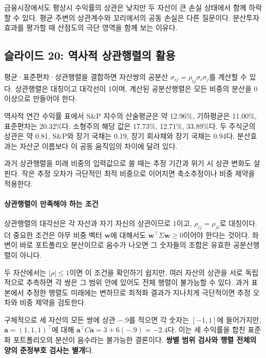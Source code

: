 \documentclass[11pt,a4paper]{article}
\begin{document}
금융시장에서도 평상시 수익률의 상관은 낮지만 두 자산이 큰 손실 상태에서 함께 하락할 수 있다. 평균 주변의 상관계수와 꼬리에서의 공동 손실은 다른 질문이다. 분산투자 효과를 평가할 때 산점도의 극단 영역을 함께 보는 이유다.
\par

\subsection{슬라이드 20: 역사적 상관행렬의 활용}

평균·표준편차·상관행렬을 결합하면 자산쌍의 공분산 $\sigma_{ij}=\rho_{ij}\sigma_i\sigma_j$를 계산할 수 있다. 상관행렬은 대칭이고 대각선이 1이며, 계산된 공분산행렬은 모든 비중의 분산을 0 이상으로 만들어야 한다.
\par

역사적 연간 수익률 표에서 S\&P 지수의 산술평균은 약 12.96\%, 기하평균은 11.00\%, 표준편차는 20.32\%다. 소형주의 해당 값은 17.73\%, 12.71\%, 33.89\%다. 두 주식군의 상관은 약 0.81, S\&P와 장기 국채는 0.19, 장기 회사채와 장기 국채는 0.94다. 분산효과는 자산군 이름보다 이 공동 움직임의 차이에 달려 있다.
\par

과거 상관행렬을 미래 비중의 입력값으로 쓸 때는 추정 기간과 위기 시 상관 변화도 살핀다. 작은 추정 오차가 극단적인 최적 비중으로 이어지면 축소추정이나 비중 제약을 적용한다.
\par

\paragraph{상관행렬이 만족해야 하는 조건}

상관행렬의 대각선은 각 자산과 자기 자신의 상관이므로 1이고, $\rho_{ij}=\rho_{ji}$로 대칭이다. 더 중요한 조건은 아무 비중 벡터 $\boldsymbol w$에 대해서도 $\boldsymbol w^\top\Sigma\boldsymbol w\ge0$이어야 한다는 것이다. 좌변이 바로 포트폴리오 분산이므로 음수가 나오면 그 숫자들의 조합은 유효한 공분산행렬이 아니다.
\par

두 자산에서는 $|\rho|\le1$이면 이 조건을 확인하기 쉽지만, 여러 자산의 상관을 서로 독립적으로 추측하면 각 쌍은 그 범위 안에 있어도 전체 행렬이 불가능할 수 있다. 과거 표본에서 추정한 행렬도 미래에는 변하므로 최적화 결과가 지나치게 극단적이면 추정 오차와 비중 제약을 검토한다.
\par

구체적으로 세 자산의 모든 쌍에 상관 $-.9$를 적으면 각 숫자는 $[-1,1]$에 들어가지만, $\mathbf a=(1,1,1)^\top$에 대해 $\mathbf a^\top C\mathbf a=3+6(-.9)=-2.4$다. 이는 세 수익률을 합친 표준화 포트폴리오의 분산이 음수라는 불가능한 결론이다. \textbf{쌍별 범위 검사와 행렬 전체의 양의 준정부호 검사는 별개}다.
\par
\end{document}
